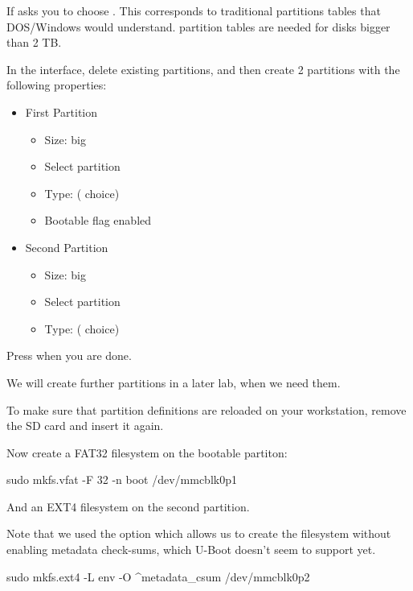 

If  asks you to  choose .
This corresponds to traditional partitions tables that DOS/Windows would 
understand.  partition tables are needed for disks bigger than 2 TB.

In the  interface, delete existing partitions, and then create 2
partitions with the following properties:

\begin{itemize}
\item First Partition
\begin{itemize}
  \item Size:  big
  \item Select  partition
  \item Type:   ( choice)
  \item Bootable flag enabled
\end{itemize}

\item Second Partition
\begin{itemize}
  \item Size:  big
  \item Select  partition
  \item Type:   ( choice)
\end{itemize}
\end{itemize}

Press  when you are done.

We will create further partitions in a later lab, when we need them.

To make sure that partition definitions are reloaded on your
workstation, remove the SD card and insert it again.

Now create a FAT32 filesystem on the bootable partiton:
\begin{bashinput}
sudo mkfs.vfat -F 32 -n boot /dev/mmcblk0p1
\end{bashinput}

And an EXT4 filesystem on the second partition.

Note that we used the  option which allows us to create
the filesystem without enabling metadata check-sums, which U-Boot doesn't
seem to support yet.
\begin{bashinput}
sudo mkfs.ext4 -L env -O ^metadata_csum /dev/mmcblk0p2
\end{bashinput}


